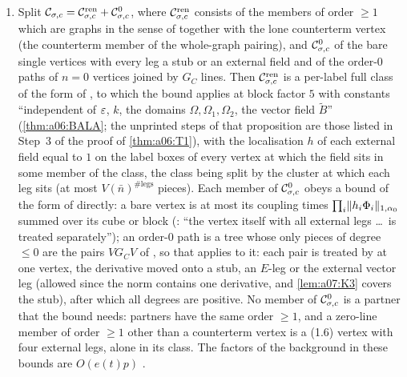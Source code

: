 \begin{lemma}
\begin{enumerate}[label=\textup{(\alph*)},nosep,leftmargin=*]
\item Split $\mathcal C_{\sigma,c}=\mathcal C^{\mathrm{ren}}_{\sigma,c}+\mathcal C^{0}_{\sigma,c}$, where $\mathcal C^{\mathrm{ren}}_{\sigma,c}$ consists of the members of order $\ge1$ which are graphs in the sense of \cite[p.~415]{Ba3} together with the lone counterterm vertex \cite[(1.7)]{Ba3} (the counterterm member of the whole-graph pairing), and $\mathcal C^0_{\sigma,c}$ of the bare single vertices with every leg a stub or an external field and of the order-$0$ paths of $n=0$ vertices joined by $G_C$ lines. Then $\mathcal C^{\mathrm{ren}}_{\sigma,c}$ is a per-label full class of the form of \cite[Prop.~1]{Ba3}, to which the bound \cite[(1.33)]{Ba3} applies at block factor $5$ with constants ``independent of $\varepsilon$, $k$, the domains $\Omega,\Omega_1,\Omega_2$, the vector field $\tilde B$'' \cite[p.~421]{Ba3} (\cref{thm:a06:BALA}; the unprinted steps of that proposition are those listed in Step~3 of the proof of \cref{thm:a06:T1}), with the localisation $h$ of each external field equal to $1$ on the label boxes of every vertex at which the field sits in some member of the class, the class being split by the cluster at which each leg sits (at most $V(\bar n)^{\#\mathrm{legs}}$ pieces). Each member of $\mathcal C^0_{\sigma,c}$ obeys a bound of the form of \cite[(1.33)]{Ba3} directly: a bare vertex is at most its coupling times $\prod_i\lVert h_i\Phi_i\rVert_{1,\alpha_0}$ summed over its cube or block (\cite[p.~421]{Ba3}: ``the vertex itself with all external legs \dots\ is treated separately''); an order-$0$ path is a tree whose only pieces of degree $\le0$ are the pairs $VG_CV$ of \cite[(2.4)]{Ba3}, so that \cite[Prop.~2.1]{Ba3} applies to it: each pair is treated by \cite[(2.8)--(2.9)]{Ba3} at one vertex, the derivative moved onto a stub, an $E$-leg or the external vector leg (allowed since the norm \cite[(1.32)]{Ba3} contains one derivative, and \cref{lem:a07:K3} covers the stub), after which all degrees are positive. No member of $\mathcal C^0_{\sigma,c}$ is a partner that the bound needs: partners have the same order $\ge1$, and a zero-line member of order $\ge1$ other than a counterterm vertex is a (1.6) vertex with four external legs, alone in its class. The factors of the background in these bounds are $O(e(t)p)$ \cite[p.~412]{Ba3}.
\end{enumerate}
\end{lemma}
